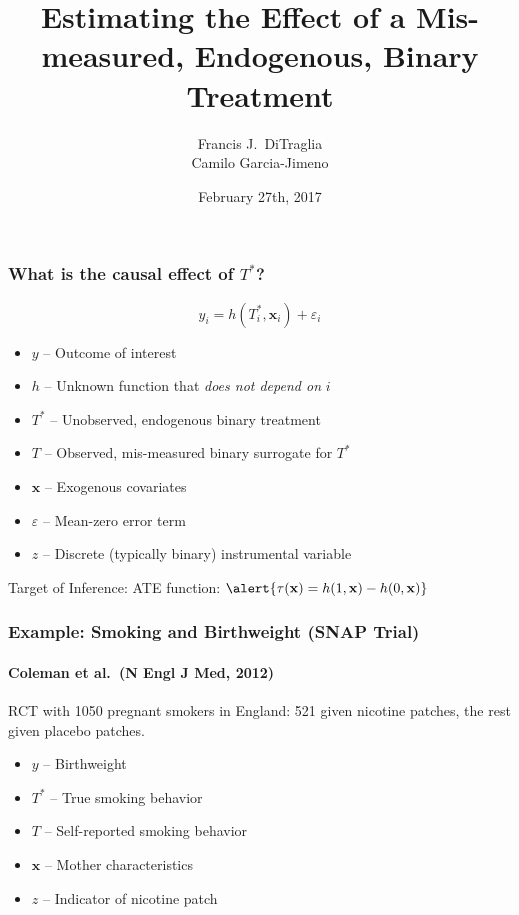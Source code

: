\documentclass{beamer}
\title[Binary Regressors]{Estimating the Effect of a Mis-measured, Endogenous, Binary Treatment}
\author[FJ DiTraglia]{Francis J.\ DiTraglia\\ Camilo Garcia-Jimeno}
\institute{University of Pennsylvania}
\date{February 27th, 2017}
\begin{document}
 

\begin{frame}[plain]
	\titlepage 
\end{frame} 
\begin{frame}
  \frametitle{What is the causal effect of $T^*$?}
  \vspace{-1em}
  \[ y_i = h(T^*_i, \mathbf{x}_i) + \varepsilon_i\]
  \vspace{-1.5em}
  \begin{itemize}
    \item $y$ -- Outcome of interest
    \item $h$ -- Unknown function that \emph{does not depend on} $i$
    \item $T^*$ -- Unobserved, endogenous binary treatment
    \item $T$ -- Observed, mis-measured binary surrogate for $T^*$
    \item $\mathbf{x}$ -- Exogenous covariates
    \item $\varepsilon$ -- Mean-zero error term
    \item $z$ -- Discrete (typically binary) instrumental variable
  \end{itemize}

 \begin{block}{Target of Inference:}
   ATE function:  $\alert{\tau(\mathbf{x}) = h(1,\mathbf{x}) - h(0,\mathbf{x})}$
  \end{block}
\end{frame}
\begin{frame}
  \frametitle{Example: Smoking and Birthweight (SNAP Trial)}
\framesubtitle{Coleman et al.\ (N Engl J Med, 2012)}
  RCT with 1050 pregnant smokers in England: 521 given nicotine patches, the rest given placebo patches.
\begin{itemize}
  \item $y$ -- Birthweight 
  \item $T^*$ -- True smoking behavior 
  \item $T$ -- Self-reported smoking behavior
  \item $\mathbf{x}$ -- Mother characteristics
  \item $z$ -- Indicator of nicotine patch
\end{itemize}
   
\end{frame}
\end{document}

